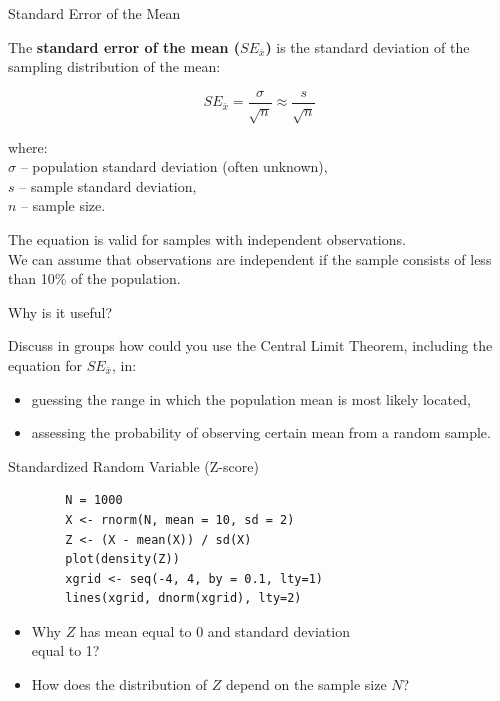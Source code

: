 \begin{frame}{Standard Error of the Mean}

    The \textbf{standard error of the mean ($SE_{\bar{x}}$)} is the standard deviation of the sampling distribution of the mean:
    
    \begin{equation}
    SE_{\bar{x}} = \frac{\sigma}{\sqrt{n}} \approx \frac{s}{\sqrt{n}}
    \end{equation}
    
    where:\\
    $\sigma$ -- population standard deviation (often unknown),\\
    $s$ -- sample standard deviation,\\
    $n$ -- sample size.
    \vspace{14pt}
    
    {\tiny
        The equation is valid for samples with independent observations.\\
        We can assume that observations are independent if the sample consists of less than 10\% of the population.}

\end{frame}

\begin{frame}{Why is it useful?}
    
    \begin{example}
        \medskip
        Discuss in groups how could you use the Central Limit Theorem, including the equation for $SE_{\bar{x}}$, in:
        \begin{itemize}
            \item guessing the range in which the population mean is most likely located,
            \item assessing the probability of observing certain mean from a random sample.
        \end{itemize}
    \end{example}

\end{frame}


\begin{frame}[fragile]{Standardized Random Variable (Z-score)}

    \begin{example}
        \medskip
        {\small
        \begin{verbatim}
        N = 1000
        X <- rnorm(N, mean = 10, sd = 2)
        Z <- (X - mean(X)) / sd(X)
        plot(density(Z))
        xgrid <- seq(-4, 4, by = 0.1, lty=1)
        lines(xgrid, dnorm(xgrid), lty=2)
        \end{verbatim}}
        \begin{itemize}
            \item Why $Z$ has mean equal to 0 and standard deviation\\equal to 1?
            \item How does the distribution of $Z$ depend on the sample size $N$?
        \end{itemize}
    \end{example}

\end{frame}

